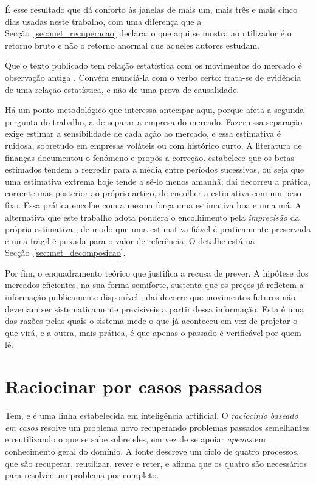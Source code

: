 É esse resultado que dá conforto às janelas de mais um, mais três e mais cinco dias usadas neste
trabalho, com uma diferença que a Secção~\ref{sec:met_recuperacao} declara: o que aqui se mostra ao
utilizador é o retorno bruto e não o retorno anormal que aqueles autores estudam.

Que o texto publicado tem relação estatística com os movimentos do mercado é observação antiga
\autocite{tetlock2007media}. Convém enunciá-la com o verbo certo: trata-se de evidência de uma
relação estatística, e não de uma prova de causalidade.

Há um ponto metodológico que interessa antecipar aqui, porque afeta a segunda pergunta do trabalho,
a de separar a empresa do mercado. Fazer essa separação exige estimar a sensibilidade de cada ação
ao mercado, e essa estimativa é ruidosa, sobretudo em empresas voláteis ou com histórico curto. A
literatura de finanças documentou o fenómeno e propôs a correção. \textcite{blume1971risk} estabelece
que os betas estimados tendem a regredir para a média entre períodos sucessivos, ou seja que uma
estimativa extrema hoje tende a sê-lo menos amanhã; daí decorreu a prática, corrente mas posterior ao
próprio artigo, de encolher a estimativa com um peso fixo. Essa prática encolhe com a mesma força uma
estimativa boa e uma má. A alternativa que este trabalho adota pondera o encolhimento pela
\emph{imprecisão} da própria estimativa \autocite{vasicek1973beta}, de modo que uma estimativa fiável
é praticamente preservada e uma frágil é puxada para o valor de referência. O detalhe está na
Secção~\ref{sec:met_decomposicao}.

Por fim, o enquadramento teórico que justifica a recusa de prever. A hipótese dos mercados
eficientes, na sua forma semiforte, sustenta que os preços já refletem a informação publicamente
disponível \autocite{fama1970efficient}; daí decorre que movimentos futuros não deveriam ser
sistematicamente previsíveis a partir dessa informação. Esta é uma das razões pelas quais o sistema mede o que já
aconteceu em vez de projetar o que virá, e a outra, mais prática, é que apenas o passado é
verificável por quem lê.

\section{Raciocinar por casos passados}
\label{sec:ctx_casos}

Tem, e é uma linha estabelecida em inteligência artificial. O \emph{raciocínio baseado em casos}
\autocite{aamodt1994cbr} resolve um problema novo recuperando problemas passados semelhantes e
reutilizando o que se sabe sobre eles, em vez de se apoiar \emph{apenas} em conhecimento geral do
domínio. A fonte descreve um ciclo de quatro processos, que são recuperar, reutilizar, rever e reter,
e afirma que os quatro são necessários para resolver um problema por completo.

